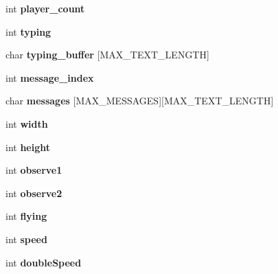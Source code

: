 \begin{DoxyCompactItemize}
\item 
\mbox{\label{structModel_aaf87a246b0eaba7090708cbf06265948}} 
int {\bfseries player\+\_\+count}
\item 
\mbox{\label{structModel_a2fcef6db45ecfe5abca7e531c3edd58d}} 
int {\bfseries typing}
\item 
\mbox{\label{structModel_a69f3bc4862cb7190f7d28013da4fe629}} 
char {\bfseries typing\+\_\+buffer} \mbox{[}M\+A\+X\+\_\+\+T\+E\+X\+T\+\_\+\+L\+E\+N\+G\+TH\mbox{]}
\item 
\mbox{\label{structModel_a5026500a00cac3bb98dd3a2085802fa8}} 
int {\bfseries message\+\_\+index}
\item 
\mbox{\label{structModel_aa623ba15ac148da584c8cc1b7a76b7e9}} 
char {\bfseries messages} \mbox{[}M\+A\+X\+\_\+\+M\+E\+S\+S\+A\+G\+ES\mbox{]}\mbox{[}M\+A\+X\+\_\+\+T\+E\+X\+T\+\_\+\+L\+E\+N\+G\+TH\mbox{]}
\item 
\mbox{\label{structModel_a95fedd30937f05f07f81b7fa3aa29add}} 
int {\bfseries width}
\item 
\mbox{\label{structModel_a710c2d2f710d349e4a76c7d78570e70f}} 
int {\bfseries height}
\item 
\mbox{\label{structModel_a3890d0a201c0de9b06065e1166c392bb}} 
int {\bfseries observe1}
\item 
\mbox{\label{structModel_a988b3760efa4ed902d218637fb19152e}} 
int {\bfseries observe2}
\item 
\mbox{\label{structModel_a5c6ca81f5d80886495091479812321f0}} 
int {\bfseries flying}
\item 
\mbox{\label{structModel_a1eb769e9d1523207c701532c5f7295e9}} 
int {\bfseries speed}
\item 
\mbox{\label{structModel_a969fa6c37bcb82129d372e74aaffd7e9}} 
int {\bfseries double\+Speed}
\item 
\mbox{\label{structModel_a4ae976c019c23dff2d52f7fc89c6c0d0}} 

\end{DoxyCompactItemize}

